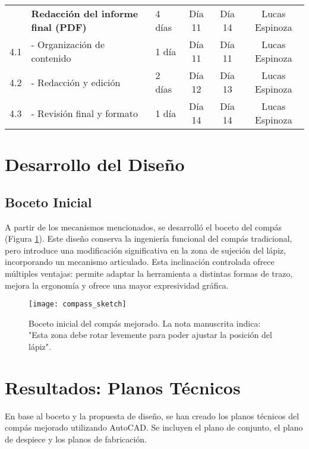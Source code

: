 \documentclass[11pt, a4paper]{article}
\begin{document}
\begin{table}[H]
{\begin{tabular}{@{}cllccc@{}}
        \addlinespace
        4   & \textbf{Redacción del informe final (PDF)} & 4 días & Día 11 & Día 14 & Lucas Espinoza \\
        \cmidrule(l){2-2}
        4.1 & \hspace{1em}- Organización de contenido & 1 día & Día 11 & Día 11 & Lucas Espinoza \\
        4.2 & \hspace{1em}- Redacción y edición & 2 días & Día 12 & Día 13 & Lucas Espinoza \\
        4.3 & \hspace{1em}- Revisión final y formato & 1 día & Día 14 & Día 14 & Lucas Espinoza \\
        \bottomrule
    \end{tabular}
    }
\end{table}

\section{Desarrollo del Diseño}
\subsection{Boceto Inicial}
A partir de los mecanismos mencionados, se desarrolló el boceto del compás (Figura \ref{fig:boceto}). Este diseño conserva la ingeniería funcional del compás tradicional, pero introduce una modificación significativa en la zona de sujeción del lápiz, incorporando un mecanismo articulado.
Esta inclinación controlada ofrece múltiples ventajas: permite adaptar la herramienta a distintas formas de trazo, mejora la ergonomía y ofrece una mayor expresividad gráfica.

\begin{figure}[H]
    \centering
    \texttt{[image: compass\_sketch]}
    \caption{Boceto inicial del compás mejorado. La nota manuscrita indica: "Esta zona debe rotar levemente para poder ajustar la posición del lápiz".}
    \label{fig:boceto}
\end{figure}

\section{Resultados: Planos Técnicos}
En base al boceto y la propuesta de diseño, se han creado los planos técnicos del compás mejorado utilizando AutoCAD. Se incluyen el plano de conjunto, el plano de despiece y los planos de fabricación.
\end{document}

